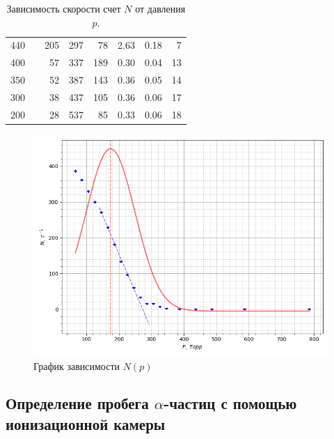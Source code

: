 \documentclass{article}
\begin{document}
\begin{table}[h!]
\begin{tabular}{|r|c|r|r|r|r|r|r|}
440 &                              & 205  & 297 & 78  & 2.63 & 0.18 & 7    \\ \cline{1-1} \cline{3-8} 
400 &                              & 57   & 337 & 189 & 0.30 & 0.04 & 13   \\ \cline{1-1} \cline{3-8} 
350 &                              & 52   & 387 & 143 & 0.36 & 0.05 & 14   \\ \cline{1-1} \cline{3-8} 
300 &                              & 38   & 437 & 105 & 0.36 & 0.06 & 17   \\ \cline{1-1} \cline{3-8} 
200 &                              & 28   & 537 & 85  & 0.33 & 0.06 & 18   \\ \hline
\end{tabular}
\caption{Зависимость скорости счет $N$ от давления $p$.}
\label{tab:2}
\end{table}
	
 \begin{figure}[h!]
			\centering
			\includegraphics[width=0.9\linewidth]{PP.png}
			\caption{График зависимости $N(p)$}
                \label{grap2}
   \end{figure}
\newpage
	\subsection{ Определение пробега $\alpha$-частиц с помощью ионизационной камеры}
	
\end{document}
